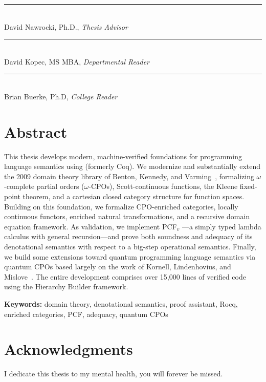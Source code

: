 \begin{titlepage}
\begin{flushleft}
\begin{minipage}{5in}
    \rule{3.5in}{0.4pt}\\[2pt]
    {\normalsize David Nawrocki, Ph.D., \textit{Thesis Advisor}}

    \vspace{0.35in}

    \rule{3.5in}{0.4pt}\\[2pt]
    {\normalsize David Kopec, MS MBA, \textit{Departmental Reader}}

    \vspace{0.35in}

    \rule{3.5in}{0.4pt}\\[2pt]
    {\normalsize Brian Buerke, Ph.D, \textit{College Reader}}

\end{minipage}
\end{flushleft}

\end{titlepage}

\chapter*{Abstract}

This thesis develops modern, machine-verified foundations for
programming language semantics using \Rocq{} (formerly Coq).
We modernize and substantially extend the 2009 domain theory library
of Benton, Kennedy, and Varming~\cite{BKV2009}, formalizing
$\omega$-complete partial orders ($\omega$-CPOs), Scott-continuous
functions, the Kleene fixed-point theorem, and a cartesian closed
category structure for function spaces.
Building on this foundation, we formalize CPO-enriched categories,
locally continuous functors, enriched natural transformations, and a
recursive domain equation framework.
As validation, we implement PCF$_v$ ---a simply typed lambda calculus
with general recursion---and prove both soundness and adequacy of its
denotational semantics with respect to a big-step operational semantics.
Finally, we build some extensions toward quantum programming language
semantics via quantum CPOs based largely on the work of 
Kornell, Lindenhovius, and Mislove~\cite{KLM2024}.
The entire development comprises over 15{,}000 lines of verified
\Rocq{} code using the Hierarchy Builder framework.

\vspace{1em}
\noindent\textbf{Keywords:} domain theory, denotational semantics,
proof assistant, Rocq, enriched categories, PCF, adequacy,
quantum CPOs

\chapter*{Acknowledgments}

I dedicate this thesis to my mental health, you will forever be missed.